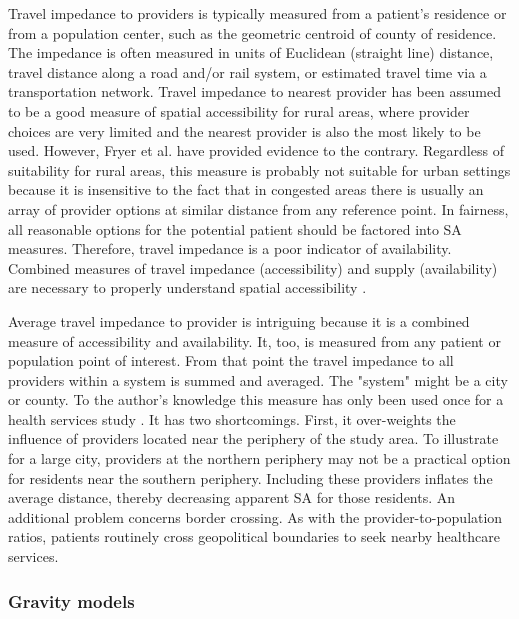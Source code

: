 
Travel impedance to providers is typically measured from a patient's residence or from a population center, such as the geometric centroid of county of residence. The impedance is often measured in units of Euclidean (straight line) distance, travel distance along a road and/or rail system, or estimated travel time via a transportation network. Travel impedance to nearest provider has been assumed to be a good measure of spatial accessibility for rural areas, where provider choices are very limited and the nearest provider is also the most likely to be used. However, Fryer et al. \cite{fryer_multi-method_1999} have provided evidence to the contrary. Regardless of suitability for rural areas, this measure is probably not suitable for urban settings because it is insensitive to the fact that in congested areas there is usually an array of provider options at similar distance from any reference point. In fairness, all reasonable options for the potential patient should be factored into SA measures. Therefore, travel impedance is a poor indicator of availability. Combined measures of travel impedance (accessibility) and supply (availability) are necessary to properly understand spatial accessibility \cite{fryer_multi-method_1999}.

Average travel impedance to provider is intriguing because it is a combined measure of accessibility and availability. It, too, is measured from any patient or population point of interest. From that point the travel impedance to all providers within a system is summed and averaged. The "system" might be a city or county. To the author's knowledge this measure has only been used once for a health services study \cite{dutt_assessment_1986}. It has two shortcomings. First, it over-weights the influence of providers located near the periphery of the study area. To illustrate for a large city, providers at the northern periphery may not be a practical option for residents near the southern periphery. Including these providers inflates the average distance, thereby decreasing apparent SA for those residents. An additional problem concerns border crossing. As with the provider-to-population ratios, patients routinely cross geopolitical boundaries to seek nearby healthcare services.

\subsubsection*{Gravity models}


